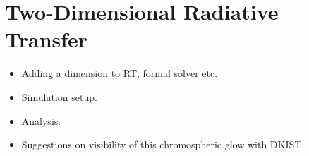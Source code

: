 \chapter{Two-Dimensional Radiative Transfer}

\begin{itemize}
    \item Adding a dimension to RT, formal solver etc.
    \item Simulation setup.
    \item Analysis.
    \item Suggestions on visibility of this chromospheric glow with DKIST.
\end{itemize}